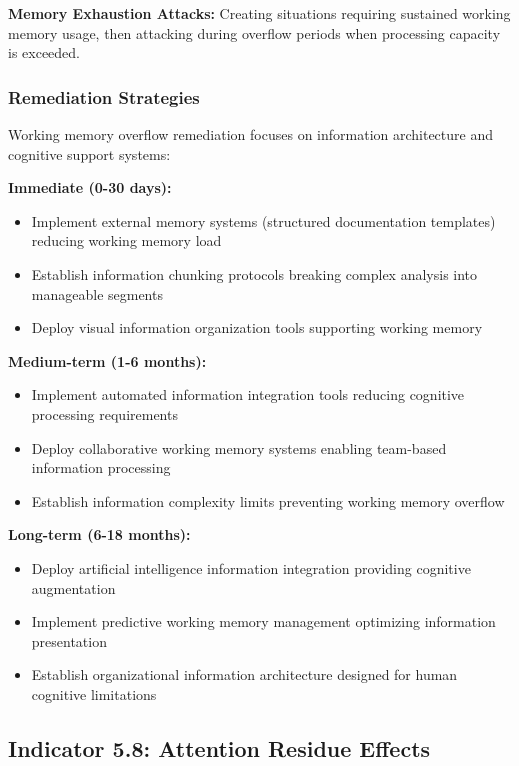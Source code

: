 \documentclass[11pt,a4paper]{article}
\begin{document}
\textbf{Memory Exhaustion Attacks:} Creating situations requiring sustained working memory usage, then attacking during overflow periods when processing capacity is exceeded.

\subsubsection{Remediation Strategies}

Working memory overflow remediation focuses on information architecture and cognitive support systems:

\textbf{Immediate (0-30 days):}
\begin{itemize}
\item Implement external memory systems (structured documentation templates) reducing working memory load
\item Establish information chunking protocols breaking complex analysis into manageable segments
\item Deploy visual information organization tools supporting working memory
\end{itemize}

\textbf{Medium-term (1-6 months):}
\begin{itemize}
\item Implement automated information integration tools reducing cognitive processing requirements
\item Deploy collaborative working memory systems enabling team-based information processing
\item Establish information complexity limits preventing working memory overflow
\end{itemize}

\textbf{Long-term (6-18 months):}
\begin{itemize}
\item Deploy artificial intelligence information integration providing cognitive augmentation
\item Implement predictive working memory management optimizing information presentation
\item Establish organizational information architecture designed for human cognitive limitations
\end{itemize}

\subsection{Indicator 5.8: Attention Residue Effects}
\end{document}
